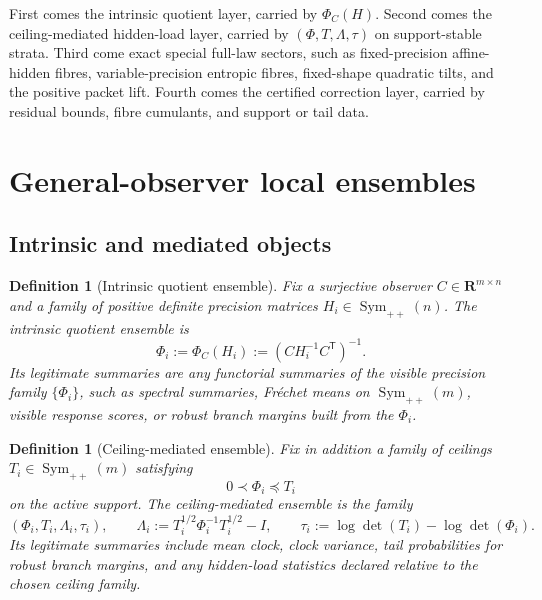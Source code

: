 \documentclass[11pt,a4paper]{article}
\numberwithin{equation}{section}
\DeclareMathOperator{\Sym}{Sym}
\newcommand{\R}{\mathbf R}
\theoremstyle{thmcompact}
\newtheorem{definition}[theorem]{Definition}
\theoremstyle{remark}
\begin{document}
First comes the intrinsic quotient layer, carried by $\Phi_C(H)$. Second comes the ceiling-mediated hidden-load layer, carried by $(\Phi,T,\Lambda,\tau)$ on support-stable strata. Third come exact special full-law sectors, such as fixed-precision affine-hidden fibres, variable-precision entropic fibres, fixed-shape quadratic tilts, and the positive packet lift. Fourth comes the certified correction layer, carried by residual bounds, fibre cumulants, and support or tail data.

\section{General-observer local ensembles}

\subsection{Intrinsic and mediated objects}

\begin{definition}[Intrinsic quotient ensemble]
Fix a surjective observer $C\in \R^{m\times n}$ and a family of positive definite precision matrices $H_i\in\Sym_{++}(n)$. The \emph{intrinsic quotient ensemble} is
\begin{equation}
\Phi_i:=\Phi_C(H_i):=(CH_i^{-1}C^{\mathsf T})^{-1}.
\end{equation}
Its legitimate summaries are any functorial summaries of the visible precision family $\{\Phi_i\}$, such as spectral summaries, Fr\'echet means on $\Sym_{++}(m)$, visible response scores, or robust branch margins built from the $\Phi_i$.
\end{definition}

\begin{definition}[Ceiling-mediated ensemble]
Fix in addition a family of ceilings $T_i\in\Sym_{++}(m)$ satisfying
\begin{equation}
0\prec \Phi_i\preceq T_i
\end{equation}
on the active support. The \emph{ceiling-mediated ensemble} is the family
\begin{equation}
(\Phi_i,T_i,\Lambda_i,\tau_i),
\qquad
\Lambda_i:=T_i^{1/2}\Phi_i^{-1}T_i^{1/2}-I,
\qquad
\tau_i:=\log\det(T_i)-\log\det(\Phi_i).
\end{equation}
Its legitimate summaries include mean clock, clock variance, tail probabilities for robust branch margins, and any hidden-load statistics declared relative to the chosen ceiling family.
\end{definition}
\end{document}

